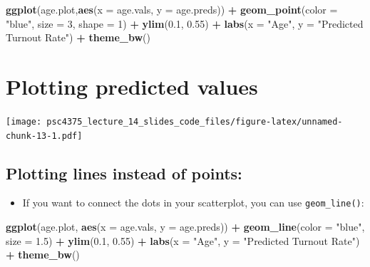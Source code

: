 \documentclass[
]{article}
\newenvironment{Shaded}{\begin{snugshade}}{\end{snugshade}}
\newcommand{\AttributeTok}[1]{\textcolor[rgb]{0.13,0.29,0.53}{#1}}
\newcommand{\DecValTok}[1]{\textcolor[rgb]{0.00,0.00,0.81}{#1}}
\newcommand{\FloatTok}[1]{\textcolor[rgb]{0.00,0.00,0.81}{#1}}
\newcommand{\FunctionTok}[1]{\textcolor[rgb]{0.13,0.29,0.53}{\textbf{#1}}}
\newcommand{\NormalTok}[1]{#1}
\newcommand{\SpecialCharTok}[1]{\textcolor[rgb]{0.81,0.36,0.00}{\textbf{#1}}}
\newcommand{\StringTok}[1]{\textcolor[rgb]{0.31,0.60,0.02}{#1}}
\providecommand{\tightlist}{%
  \setlength{\itemsep}{0pt}\setlength{\parskip}{0pt}}
\begin{document}
\begin{Shaded}
\begin{Highlighting}[]
\FunctionTok{ggplot}\NormalTok{(age.plot,}\FunctionTok{aes}\NormalTok{(}\AttributeTok{x =}\NormalTok{ age.vals, }\AttributeTok{y =}\NormalTok{ age.preds)) }\SpecialCharTok{+}
  \FunctionTok{geom\_point}\NormalTok{(}\AttributeTok{color =} \StringTok{"blue"}\NormalTok{, }\AttributeTok{size =} \DecValTok{3}\NormalTok{, }\AttributeTok{shape =} \DecValTok{1}\NormalTok{) }\SpecialCharTok{+} \FunctionTok{ylim}\NormalTok{(}\FloatTok{0.1}\NormalTok{, }\FloatTok{0.55}\NormalTok{) }\SpecialCharTok{+}
  \FunctionTok{labs}\NormalTok{(}\AttributeTok{x =} \StringTok{"Age"}\NormalTok{, }\AttributeTok{y =} \StringTok{"Predicted Turnout Rate"}\NormalTok{) }\SpecialCharTok{+} \FunctionTok{theme\_bw}\NormalTok{()}
\end{Highlighting}
\end{Shaded}

\section{Plotting predicted values}\label{plotting-predicted-values}

\texttt{[image: psc4375\_lecture\_14\_slides\_code\_files/figure-latex/unnamed-chunk-13-1.pdf]}

\subsection{Plotting lines instead of
points:}\label{plotting-lines-instead-of-points}

\begin{itemize}
\tightlist
\item
  If you want to connect the dots in your scatterplot, you can use
  \texttt{geom\_line()}:
\end{itemize}

\begin{Shaded}
\begin{Highlighting}[]
\FunctionTok{ggplot}\NormalTok{(age.plot, }\FunctionTok{aes}\NormalTok{(}\AttributeTok{x =}\NormalTok{ age.vals, }\AttributeTok{y =}\NormalTok{ age.preds)) }\SpecialCharTok{+}
  \FunctionTok{geom\_line}\NormalTok{(}\AttributeTok{color =} \StringTok{"blue"}\NormalTok{, }\AttributeTok{size =} \FloatTok{1.5}\NormalTok{) }\SpecialCharTok{+}
  \FunctionTok{ylim}\NormalTok{(}\FloatTok{0.1}\NormalTok{, }\FloatTok{0.55}\NormalTok{) }\SpecialCharTok{+}
  \FunctionTok{labs}\NormalTok{(}\AttributeTok{x =} \StringTok{"Age"}\NormalTok{, }\AttributeTok{y =} \StringTok{"Predicted Turnout Rate"}\NormalTok{) }\SpecialCharTok{+}
  \FunctionTok{theme\_bw}\NormalTok{()}
\end{Highlighting}
\end{Shaded}
\end{document}
